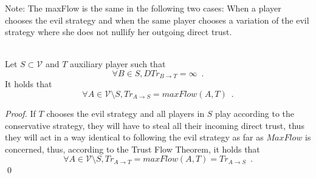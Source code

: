 \documentclass[11pt]{llncs}
\begin{document}
    Note: The maxFlow is the same in the following two cases: When a player chooses the evil strategy and when the same
    player chooses a variation of the evil strategy where she does not nullify her outgoing direct trust.
    \begin{theorem} \ \\
       \label{trustmany}
       Let $S \subset \mathcal{V}$ and $T$ auxiliary player such that
       \begin{equation}
          \forall B \in S, DTr_{B \rightarrow T} = \infty \enspace.
       \end{equation}
       It holds that
       \begin{equation}
          \forall A \in \mathcal{V} \setminus S, Tr_{A \rightarrow S} = maxFlow\left(A, T\right) \enspace.
       \end{equation}
    \end{theorem}       
    \begin{proof}
       If $T$ chooses the evil strategy and all players in $S$ play according to the conservative strategy, they will have to
       steal all their incoming direct trust, thus they will act in a way identical to following the evil strategy as far as
       $MaxFlow$ is concerned, thus, according to the Trust Flow Theorem, it holds that
       \begin{equation}
          \forall A \in \mathcal{V} \setminus S, Tr_{A \rightarrow T} = maxFlow\left(A, T\right) = Tr_{A \rightarrow S}
          \enspace.
       \end{equation}
       \qed
    \end{proof}
\end{document}
